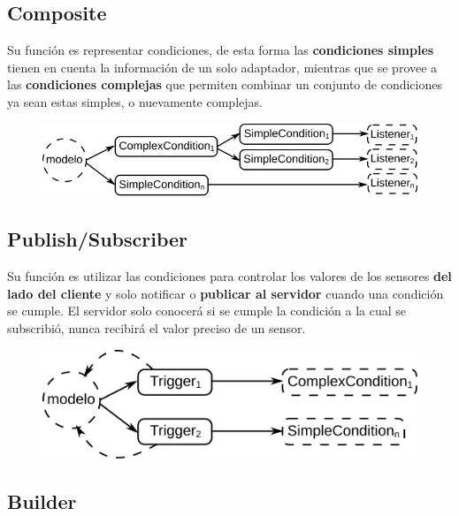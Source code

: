 \documentclass[
paper=128mm:96mm, %
fontsize=11pt, %
pagesize, %
parskip=half-, %
]{scrartcl} %
\theoremstyle{mythmstyle} %
\begin{document}
\clearpage

\subsection{Composite}

Su función es representar condiciones, de esta forma las \textbf{condiciones simples} tienen en cuenta la información de un solo adaptador, mientras que se provee a las \textbf{condiciones complejas} que permiten combinar un conjunto de condiciones ya sean estas simples, o nuevamente complejas.

\begin{figure}[ht!]
\centering\includegraphics[width=0.8\linewidth]{Figures/DesignPatternComposite}
\end{figure}

\clearpage

\subsection{Publish/Subscriber}

Su función es utilizar las condiciones para controlar los valores de los sensores \textbf{del lado del cliente} y solo notificar o \textbf{publicar al servidor} cuando una condición se cumple. El servidor solo conocerá si se cumple la condición a la cual se subscribió, nunca recibirá el valor preciso de un sensor.

\begin{figure}[ht!]
\centering\includegraphics[width=0.8\linewidth]{Figures/DesignPatternPublishSubscriber}
\end{figure}

\clearpage

\subsection{Builder}
\end{document}
